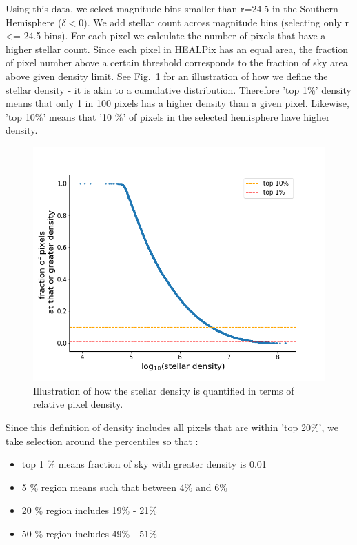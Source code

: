 \documentclass[DM,lsstdraft,toc,usenatbib]{lsstdoc}
\begin{document}
Using this data, we select magnitude bins smaller than r=24.5 in the Southern Hemisphere ($\delta < 0$).  We add stellar count across magnitude bins (selecting only  r <= 24.5 bins).   For each pixel we calculate the number of pixels that have a higher stellar count.  Since each pixel in HEALPix has an equal area, the fraction of pixel number above a certain threshold corresponds to the fraction of sky area above given density limit. See Fig.~\ref{fig:illustrate_density} for an illustration of how we define the stellar density - it is akin to a cumulative distribution. Therefore 'top 1\%' density means that only 1 in 100 pixels has a higher density than a given pixel.  Likewise,  'top 10\%' means that '10 \%' of pixels in the selected hemisphere have higher density. 

\begin{figure}
\includegraphics[width=1.0\columnwidth]{figs/Illustrate_density_percentile.png}
\caption{Illustration of how the stellar density is quantified in terms of relative pixel density. }
\label{fig:illustrate_density}
\end{figure} 


Since this definition of density includes all pixels that are within 'top 20\%', we take selection around the percentiles so that :

\begin{itemize}
\item top  1 \%  means  fraction of sky with greater density is 0.01
\item 5 \% region means such that between  4\% and 6\%
\item 20 \% region  includes   19\% - 21\%
\item 50 \% region includes 49\% - 51\% 
\end{itemize}
\end{document}
